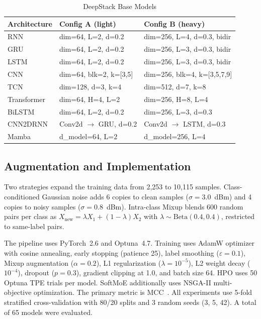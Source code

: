 \begin{table}
    \centering
    \caption{DeepStack Base Models}
    \label{tab:ds_bases}
    \begin{tabular}{lll}\toprule
        Architecture & Config A (light) & Config B (heavy) \\\midrule
        RNN          & dim=64, L=2, d=0.2       & dim=256, L=4, d=0.3, bidir  \\
        GRU          & dim=64, L=2, d=0.2       & dim=256, L=3, d=0.3, bidir  \\
        LSTM         & dim=64, L=2, d=0.2       & dim=256, L=3, d=0.3, bidir  \\
        CNN          & dim=64, blk=2, k=[3,5]     & dim=256, blk=4, k=[3,5,7,9]  \\
        TCN          & dim=128, d=3, k=4          & dim=512, d=7, k=8            \\
        Transformer  & dim=64, H=4, L=2           & dim=256, H=8, L=4            \\
        BiLSTM       & dim=64, L=2, d=0.2        & dim=256, L=3, d=0.3          \\
        CNN2DRNN     & Conv2d $\to$ GRU, d=0.2   & Conv2d $\to$ LSTM, d=0.3     \\
        Mamba        & d\_model=64, L=2           & d\_model=256, L=4            \\\bottomrule
    \end{tabular}
\end{table}

\subsection{Augmentation and Implementation}

Two strategies expand the training data from 2,253 to 10,115 samples. Class-conditioned Gaussian noise adds 6 copies to clean samples ($\sigma=3.0$~dBm) and 4 copies to noisy samples ($\sigma=0.8$~dBm). Intra-class Mixup blends 600 random pairs per class as $X_{\text{new}} = \lambda X_1 + (1-\lambda) X_2$ with $\lambda \sim \text{Beta}(0.4,0.4)$, restricted to same-label pairs.

The pipeline uses PyTorch~2.6 and Optuna~4.7. Training uses AdamW optimizer with cosine annealing, early stopping (patience 25), label smoothing ($\varepsilon=0.1$), Mixup augmentation ($\alpha=0.2$), L1 regularization ($\lambda=10^{-5}$), L2 weight decay ($10^{-4}$), dropout ($p=0.3$), gradient clipping at 1.0, and batch size 64. HPO uses 50 Optuna TPE trials per model. SoftMoE additionally uses NSGA-II multi-objective optimization. The primary metric is MCC~\cite{chicco2020mcc}. All experiments use 5-fold stratified cross-validation with 80/20 splits and 3 random seeds (3, 5, 42). A total of 65 models were evaluated.
